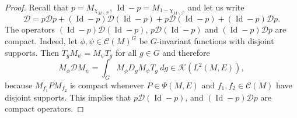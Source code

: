 \documentclass[11pt,a4paper]{amsart}
\newcommand{\maC}{\mathcal C}
\newcommand{\maD}{\mathcal D}
\newcommand{\maK}{\mathcal K}
\newcommand{\maP}{\mathcal P}
\newcommand\<{\langle}
\renewcommand\>{\rangle}
\newcommand{\oid}{\operatorname{Id}}
\theoremstyle{definition}
\begin{document}
\begin{proof}
%

Recall that $p=M_{\chi_{M\smallsetminus \maP}}$, $\oid-p = M_{1-\chi_{M\smallsetminus \maP}}$ and 
let us write 
\begin{equation*}
\maD= p \maD p + (\oid-p) \maD (\oid-p) +p \maD (\oid-p) + (\oid - p) \maD p.
\end{equation*}
The operators $(\oid-p) \maD (\oid-p)$, $p \maD (\oid-p)$ and $(\oid - p) \maD p$ are compact.
Indeed, let 
$\phi,\psi \in \maC(M)^G$ be $G$-invariant functions with disjoint supports. 
Then  $T_g M_\psi=M_\psi T_g$ for all $g\in G$ and therefore
\begin{equation*}
M_\phi \maD M_\psi 
= \int_G M_\phi D_g  M_\psi  T_g \ dg \in \maK(L^2(M,E)), 
\end{equation*}
because $M_{f_1} P M_{f_2}$ is compact whenever $ P \in \Psi(M,E)$ and $f_1,f_2 \in \maC(M)$ have disjoint supports.
This implies that $p \maD (\oid-p)$, and $ (\oid-p) \maD p$ are compact operators.


\end{proof}
\end{document}
